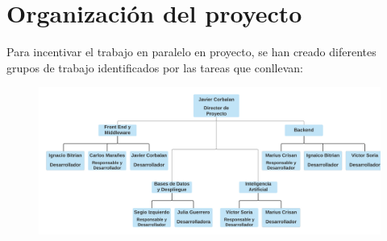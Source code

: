 \section{Organización del proyecto}
\label{organiz}

Para incentivar el trabajo en paralelo en proyecto, se han creado diferentes grupos de trabajo identificados por las tareas que conllevan:

\begin{figure}[h]
	\centering \includegraphics[scale=0.6]{figuras/organigrama.png}
\end{figure}


